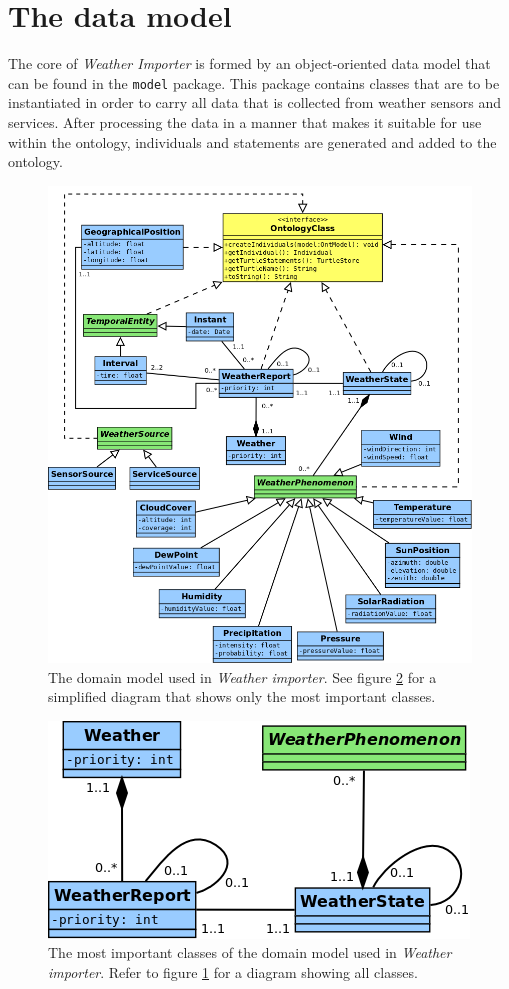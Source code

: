 \section{The data model}
\label{sec:importer_model}

The core of \emph{Weather Importer} is formed by an object-oriented data model that can be found in the \texttt{model} package. This package contains classes that are to be instantiated in order to carry all data that is collected from weather sensors and services. After processing the data in a manner that makes it suitable for use within the \thinkhomeweather ontology, individuals and statements are generated and added to the ontology.

\begin{figure}
\centering
\includegraphics[width=\textwidth]{figures/diagrams/importer-model.png}
\caption{The domain model used in \emph{Weather importer}. See figure \ref{fig:importer_model2} for a simplified diagram that shows only the most important classes.}
\label{fig:importer_model1}
\end{figure}

\begin{figure}
\centering
\includegraphics[width=.5\textwidth]{figures/diagrams/importer-model-simple.png}
\caption{The most important classes of the domain model used in \emph{Weather importer}. Refer to figure \ref{fig:importer_model1} for a diagram showing all classes.}
\label{fig:importer_model2}
\end{figure}

